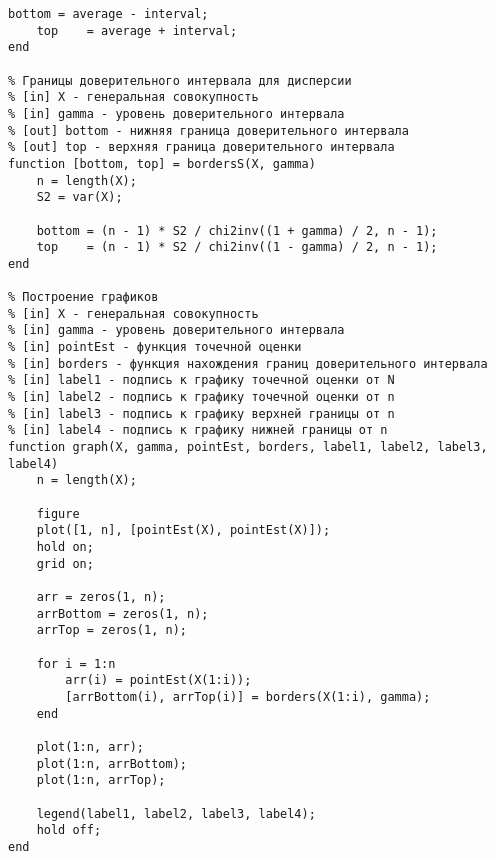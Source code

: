 \begin{lstlisting}[caption=Текст программы]
    bottom = average - interval;
    top    = average + interval;
end

% Границы доверительного интервала для дисперсии
% [in] X - генеральная совокупность
% [in] gamma - уровень доверительного интервала
% [out] bottom - нижняя граница доверительного интервала
% [out] top - верхняя граница доверительного интервала
function [bottom, top] = bordersS(X, gamma)
    n = length(X);
    S2 = var(X);

    bottom = (n - 1) * S2 / chi2inv((1 + gamma) / 2, n - 1);
    top    = (n - 1) * S2 / chi2inv((1 - gamma) / 2, n - 1);
end

% Построение графиков
% [in] X - генеральная совокупность
% [in] gamma - уровень доверительного интервала
% [in] pointEst - функция точечной оценки
% [in] borders - функция нахождения границ доверительного интервала
% [in] label1 - подпись к графику точечной оценки от N
% [in] label2 - подпись к графику точечной оценки от n
% [in] label3 - подпись к графику верхней границы от n
% [in] label4 - подпись к графику нижней границы от n
function graph(X, gamma, pointEst, borders, label1, label2, label3, label4)
    n = length(X);

    figure
    plot([1, n], [pointEst(X), pointEst(X)]);
    hold on;
    grid on;

    arr = zeros(1, n);
    arrBottom = zeros(1, n);
    arrTop = zeros(1, n);

    for i = 1:n
        arr(i) = pointEst(X(1:i));
        [arrBottom(i), arrTop(i)] = borders(X(1:i), gamma);
    end

    plot(1:n, arr);
    plot(1:n, arrBottom);
    plot(1:n, arrTop);

    legend(label1, label2, label3, label4);
    hold off;
end
\end{lstlisting}
